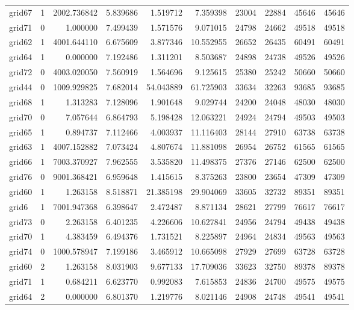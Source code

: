 \begin{longtable}{|l|r|r|r|r|r|r|r|r|r|}
grid67 & 1 & 2002.736842 & 5.839686 & 1.519712 & 7.359398 & 23004 & 22884 & 45646 & 45646 \\
grid71 & 0 & 1.000000 & 7.499439 & 1.571576 & 9.071015 & 24798 & 24662 & 49518 & 49518 \\
grid62 & 1 & 4001.644110 & 6.675609 & 3.877346 & 10.552955 & 26652 & 26435 & 60491 & 60491 \\
grid64 & 1 & 0.000000 & 7.192486 & 1.311201 & 8.503687 & 24898 & 24738 & 49526 & 49526 \\
grid72 & 0 & 4003.020050 & 7.560919 & 1.564696 & 9.125615 & 25380 & 25242 & 50660 & 50660 \\
grid44 & 0 & 1009.929825 & 7.682014 & 54.043889 & 61.725903 & 33634 & 32263 & 93685 & 93685 \\
grid68 & 1 & 1.313283 & 7.128096 & 1.901648 & 9.029744 & 24200 & 24048 & 48030 & 48030 \\
grid70 & 0 & 7.057644 & 6.864793 & 5.198428 & 12.063221 & 24924 & 24794 & 49503 & 49503 \\
grid65 & 1 & 0.894737 & 7.112466 & 4.003937 & 11.116403 & 28144 & 27910 & 63738 & 63738 \\
grid63 & 1 & 4007.152882 & 7.073424 & 4.807674 & 11.881098 & 26954 & 26752 & 61565 & 61565 \\
grid66 & 1 & 7003.370927 & 7.962555 & 3.535820 & 11.498375 & 27376 & 27146 & 62500 & 62500 \\
grid76 & 0 & 9001.368421 & 6.959648 & 1.415615 & 8.375263 & 23800 & 23654 & 47309 & 47309 \\
grid60 & 1 & 1.263158 & 8.518871 & 21.385198 & 29.904069 & 33605 & 32732 & 89351 & 89351 \\
grid6 & 1 & 7001.947368 & 6.398647 & 2.472487 & 8.871134 & 28621 & 27799 & 76617 & 76617 \\
grid73 & 0 & 2.263158 & 6.401235 & 4.226606 & 10.627841 & 24956 & 24794 & 49438 & 49438 \\
grid70 & 1 & 4.383459 & 6.494376 & 1.731521 & 8.225897 & 24964 & 24834 & 49563 & 49563 \\
grid74 & 0 & 1000.578947 & 7.199186 & 3.465912 & 10.665098 & 27929 & 27699 & 63728 & 63728 \\
grid60 & 2 & 1.263158 & 8.031903 & 9.677133 & 17.709036 & 33623 & 32750 & 89378 & 89378 \\
grid71 & 1 & 0.684211 & 6.623770 & 0.992083 & 7.615853 & 24836 & 24700 & 49575 & 49575 \\
grid64 & 2 & 0.000000 & 6.801370 & 1.219776 & 8.021146 & 24908 & 24748 & 49541 & 49541 \\

\end{longtable}
